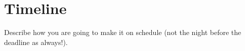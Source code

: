 \section{Timeline}
Describe how you are going to make it on schedule (not the night before the deadline as always!).
